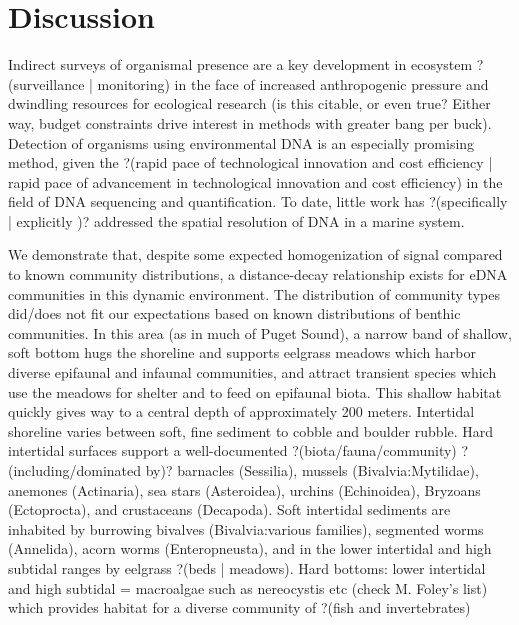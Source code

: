 \documentclass[11pt,letterpaper]{article} %
\begin{document}
\section*{Discussion}
Indirect surveys of organismal presence are a key development in ecosystem ?(surveillance | monitoring) in the face of increased anthropogenic pressure and dwindling resources for ecological research (is this citable, or even true? Either way, budget constraints drive interest in methods with greater bang per buck).
Detection of organisms using environmental DNA is an especially promising method, given the ?(rapid pace of technological innovation and cost efficiency | rapid pace of advancement in technological innovation and cost efficiency) in the field of DNA sequencing and quantification.
To date, little work has ?(specifically | explicitly )? addressed the spatial resolution of DNA in a marine system.

We demonstrate that, despite some expected homogenization of signal compared to known community distributions, a distance-decay relationship exists for eDNA communities in this dynamic environment.
The distribution of community types did/does not fit our expectations based on known distributions of benthic communities.
In this area (as in much of Puget Sound), a narrow band of shallow, soft bottom hugs the shoreline and supports eelgrass meadows which harbor diverse epifaunal and infaunal communities, and attract transient species which use the meadows for shelter and to feed on epifaunal biota.
This shallow habitat quickly gives way to a central depth of approximately 200 meters.
Intertidal shoreline varies between soft, fine sediment to cobble and boulder rubble.
Hard intertidal surfaces support a well-documented ?(biota/fauna/community) ?(including/dominated by)? barnacles (Sessilia), mussels (Bivalvia:Mytilidae), anemones (Actinaria), sea stars (Asteroidea), urchins (Echinoidea), Bryzoans (Ectoprocta), and crustaceans (Decapoda).
Soft intertidal sediments are inhabited by burrowing bivalves (Bivalvia:various families), segmented worms (Annelida), acorn worms (Enteropneusta), and in the lower intertidal and high subtidal ranges by eelgrass ?(beds | meadows).
Hard bottoms: lower intertidal and high subtidal = macroalgae such as nereocystis etc (check M. Foley's list) which provides habitat for a diverse community of ?(fish and invertebrates)
\end{document}
